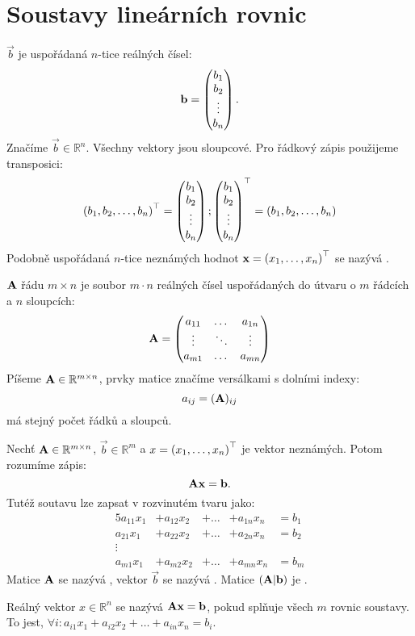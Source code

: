 \section{Soustavy lineárních rovnic}

\begin{definition}
     $\vec{b}$ je uspořádaná $n$-tice
    reálných čísel:
    $$\mathbf{b} = \begin{pmatrix}b_1\\b_2\\\vdots\\b_n\end{pmatrix}.$$
    Značíme $\vec{b} \in \mathbb{R}^n$. Všechny vektory jsou sloupcové. Pro
    řádkový zápis použijeme transposici:
    $$ \left( b_1,b_2,\dots,b_n\right)^\top = \begin{pmatrix}b_1\\b_2\\\vdots\\b_n\end{pmatrix};
    \begin{pmatrix}b_1\\b_2\\\vdots\\b_n\end{pmatrix}^\top = \left( b_1,b_2,\dots,b_n\right)$$
    Podobně uspořádaná $n$-tice neznámých hodnot $\mathbf{x} =
    \left( x_1,\dots,x_n\right)^\top$ se nazývá .
\end{definition}

\begin{definition}
     $\mathbf{A}$ řádu $m \times n$ je soubor $m \cdot n$ reálných
    čísel uspořádaných do útvaru o $m$ řádcích a $n$ sloupcích:
    \[ \mathbf{A} = \begin{pmatrix}
            a_{11} &\dots  &a_{1n}\\
            \vdots &\ddots &\vdots\\
            a_{m1} &\dots  &a_{mn}
    \end{pmatrix}  \]
    Píšeme $\mathbf{A} \in \mathbb{R}^{m \times n}$, prvky matice značíme
    versálkami s dolními indexy:
    $$ a_{ij} = (\mathbf{A})_{ij}$$
     má stejný počet řádků a sloupců.
\end{definition}

\begin{definition}
    Nechť $\mathbf{A} \in \mathbb{R}^{m \times n}$,  $\vec{b} \in \mathbb{R}^m$
    a $x = \left( x_1,\dots,x_n\right)^\top$ je vektor neznámých. Potom 
     rozumíme zápis:
    $$ \mathbf{A}\mathbf{x} = \mathbf{b}.$$
    Tutéž soutavu lze zapsat v rozvinutém tvaru jako:
    \begin{alignat*}{5}
        a_{11}x_1 &+a_{12}x_2 &+\dots &+a_{1n}x_n &=b_1  \\
        a_{21}x_1 &+a_{22}x_2 &+\dots &+a_{2n}x_n &=b_2  \\
        \vdots \\
        a_{m1}x_1 &+a_{m2}x_2 &+\dots &+a_{mn}x_n &=b_m 
    \end{alignat*}
    Matice $\mathbf{A}$ se nazývá , vektor $\vec{b}$ se 
    nazývá .
    Matice $(\mathbf{A}|\mathbf{b})$ je .
\end{definition}

\begin{definition}
    Reálný vektor $x \in \mathbb{R}^n$ se nazývá 
    $\mathbf{A}\mathbf{x} = \mathbf{b}$, pokud splňuje všech $m$ rovnic soustavy. To
    jest, $\forall i: a_{i1}x_1 + a_{i2}x_2 + \dots + a_{in}x_n = b_i$.
\end{definition}

